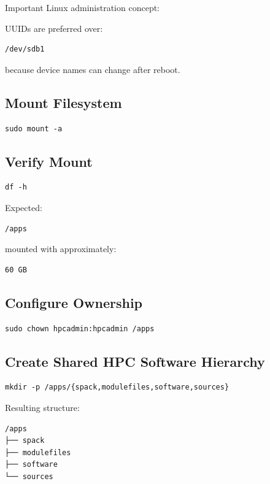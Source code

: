 \documentclass[11pt]{article}
\begin{document}
Important Linux administration concept:

UUIDs are preferred over:

\begin{verbatim}
/dev/sdb1
\end{verbatim}

because device names can change after reboot.
\subsection{Mount Filesystem}
\label{sec:org92c611c}

\begin{verbatim}
sudo mount -a
\end{verbatim}
\subsection{Verify Mount}
\label{sec:org1afee73}

\begin{verbatim}
df -h
\end{verbatim}

Expected:

\begin{verbatim}
/apps
\end{verbatim}

mounted with approximately:

\begin{verbatim}
60 GB
\end{verbatim}
\subsection{Configure Ownership}
\label{sec:orgc411bc7}

\begin{verbatim}
sudo chown hpcadmin:hpcadmin /apps
\end{verbatim}
\subsection{Create Shared HPC Software Hierarchy}
\label{sec:org3b3bd8b}

\begin{verbatim}
mkdir -p /apps/{spack,modulefiles,software,sources}
\end{verbatim}

Resulting structure:

\begin{verbatim}
/apps
├── spack
├── modulefiles
├── software
└── sources
\end{verbatim}
\end{document}
